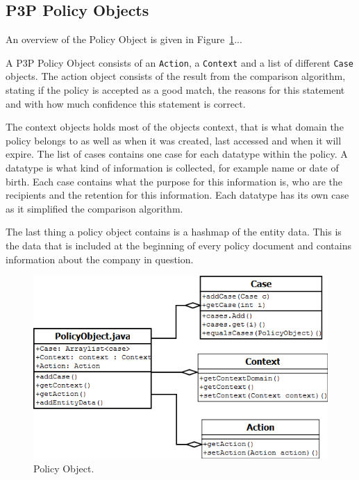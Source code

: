 \subsection{P3P Policy Objects}\label{p3pPolObj}
An overview of the Policy Object is given in Figure~\ref{po_fig}...

A P3P Policy Object consists of an \texttt{Action}, a \texttt{Context} and a list of different \texttt{Case} objects. The action object consists of the result from the comparison algorithm, stating if the policy is accepted as a good match, the reasons for this statement and with how much confidence this statement is correct.

The context objects holds most of the objects context, that is what domain the policy belongs to as well as when it was created, last accessed and when it will expire. The list of cases contains one case for each datatype within the policy. A datatype is what kind of information is collected, for example name or date of birth. Each case contains what the purpose for this information is, who are the recipients and the retention for this information. Each datatype has its own case as it simplified the comparison algorithm.

The last thing a policy object contains is a hashmap of the entity data. This is the data that is included at the beginning of every policy document and contains information about the company in question.

\begin{figure}[htbp]
\begin{center}
\includegraphics[width = \textwidth]{DesignReport/uml/po.png}
\caption{Policy Object.}
\label{po_fig}
\end{center}
\end{figure}


